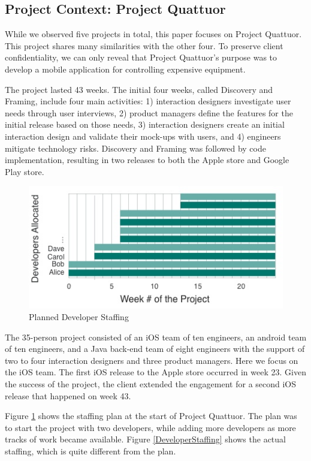 \subsection{Project Context: Project Quattuor}
\label{ProjectQuattuor}
While we observed five projects in total, this paper focuses on Project Quattuor. This project shares many similarities with the other four. To preserve client confidentiality, we can only reveal that Project Quattuor’s purpose was to develop a mobile application for controlling expensive equipment.

The project lasted 43 weeks. The initial four weeks, called Discovery and Framing, include four main activities: 1) interaction designers investigate user needs through user interviews, 2) product managers define the features for the initial release based on those needs, 3) interaction designers create an initial interaction design and validate their mock-ups with users, and 4) engineers mitigate technology risks. Discovery and Framing was followed by code implementation, resulting in two releases to both the Apple store and Google Play store.

\begin{figure}[t]
\centering
\includegraphics[width=\oneColumnWidth{}]{sustainable_software_development_images/OriginalDeveloperStaffingV3.jpg}
\caption{Planned Developer Staffing}
\label{PlannedDeveloperStaffing}
\end{figure}

The 35-person project consisted of an iOS team of ten engineers, an android team of ten engineers, and a Java back-end team of eight engineers with the support of two to four interaction designers and three product managers. Here we focus on the iOS team. The first iOS release to the Apple store occurred in week 23. Given the success of the project, the client extended the engagement for a second iOS release that happened on week 43. 

Figure \ref{PlannedDeveloperStaffing} shows the staffing plan at the start of Project Quattuor. The plan was to start the project with two developers, while adding more developers as more tracks of work became available. Figure \ref{DeveloperStaffing} shows the actual staffing, which is quite different from the plan.

